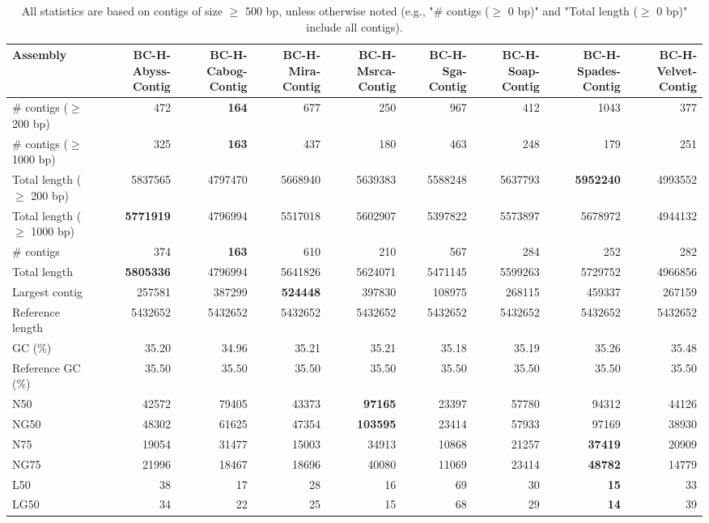 \documentclass[12pt,a4paper]{article}
\begin{document}
\begin{table}[ht]
\begin{center}
\caption{All statistics are based on contigs of size $\geq$ 500 bp, unless otherwise noted (e.g., "\# contigs ($\geq$ 0 bp)" and "Total length ($\geq$ 0 bp)" include all contigs).}
\begin{tabular}{|l*{8}{|r}|}
\hline
Assembly & BC-H-Abyss-Contig & BC-H-Cabog-Contig & BC-H-Mira-Contig & BC-H-Msrca-Contig & BC-H-Sga-Contig & BC-H-Soap-Contig & BC-H-Spades-Contig & BC-H-Velvet-Contig \\ \hline
\# contigs ($\geq$ 200 bp) & 472 & {\bf 164} & 677 & 250 & 967 & 412 & 1043 & 377 \\ \hline
\# contigs ($\geq$ 1000 bp) & 325 & {\bf 163} & 437 & 180 & 463 & 248 & 179 & 251 \\ \hline
Total length ($\geq$ 200 bp) & 5837565 & 4797470 & 5668940 & 5639383 & 5588248 & 5637793 & {\bf 5952240} & 4993552 \\ \hline
Total length ($\geq$ 1000 bp) & {\bf 5771919} & 4796994 & 5517018 & 5602907 & 5397822 & 5573897 & 5678972 & 4944132 \\ \hline
\# contigs & 374 & {\bf 163} & 610 & 210 & 567 & 284 & 252 & 282 \\ \hline
Total length & {\bf 5805336} & 4796994 & 5641826 & 5624071 & 5471145 & 5599263 & 5729752 & 4966856 \\ \hline
Largest contig & 257581 & 387299 & {\bf 524448} & 397830 & 108975 & 268115 & 459337 & 267159 \\ \hline
Reference length & 5432652 & 5432652 & 5432652 & 5432652 & 5432652 & 5432652 & 5432652 & 5432652 \\ \hline
GC (\%) & 35.20 & 34.96 & 35.21 & 35.21 & 35.18 & 35.19 & 35.26 & 35.48 \\ \hline
Reference GC (\%) & 35.50 & 35.50 & 35.50 & 35.50 & 35.50 & 35.50 & 35.50 & 35.50 \\ \hline
N50 & 42572 & 79405 & 43373 & {\bf 97165} & 23397 & 57780 & 94312 & 44126 \\ \hline
NG50 & 48302 & 61625 & 47354 & {\bf 103595} & 23414 & 57933 & 97169 & 38930 \\ \hline
N75 & 19054 & 31477 & 15003 & 34913 & 10868 & 21257 & {\bf 37419} & 20909 \\ \hline
NG75 & 21996 & 18467 & 18696 & 40080 & 11069 & 23414 & {\bf 48782} & 14779 \\ \hline
L50 & 38 & 17 & 28 & 16 & 69 & 30 & {\bf 15} & 33 \\ \hline
LG50 & 34 & 22 & 25 & 15 & 68 & 29 & {\bf 14} & 39 \\ \hline

\end{tabular}
\end{center}
\end{table}
\end{document}
